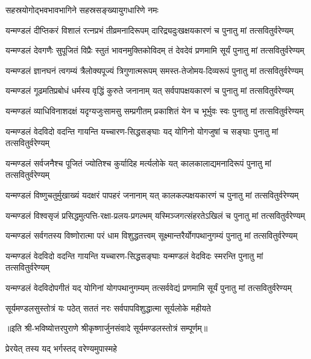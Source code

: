 {सहस्रयोगोद्भवभावभागिने सहस्रसङ्ख्यायुगधारिणे नमः}

\twolineshloka
{यन्मण्डलं दीप्तिकरं विशालं रत्नप्रभं तीव्रमनादिरूपम्}
{दारिद्र्यदुःखक्षयकारणं च पुनातु मां तत्सवितुर्वरेण्यम्}

\twolineshloka
{यन्मण्डलं देवगणैः सुपूजितं   विप्रैः स्तुतं भावनमुक्तिकोविदम्}
{तं देवदेवं प्रणमामि सूर्यं   पुनातु मां तत्सवितुर्वरेण्यम्}

\twolineshloka
{यन्मण्डलं ज्ञानघनं त्वगम्यं   त्रैलोक्यपूज्यं त्रिगुणात्मरूपम्}
{समस्त-तेजोमय-दिव्यरूपं   पुनातु मां तत्सवितुर्वरेण्यम्}

\twolineshloka
{यन्मण्डलं गूढमतिप्रबोधं   धर्मस्य वृद्धिं कुरुते जनानाम्}
{यत् सर्वपापक्षयकारणं च   पुनातु मां तत्सवितुर्वरेण्यम्}

\twolineshloka
{यन्मण्डलं व्याधिविनाशदक्षं   यदृग्यजुःसामसु सम्प्रगीतम्}
{प्रकाशितं येन च भूर्भुवः स्वः   पुनातु मां तत्सवितुर्वरेण्यम्}

\twolineshloka
{यन्मण्डलं वेदविदो वदन्ति   गायन्ति यच्चारण-सिद्धसङ्घाः}
{यद् योगिनो योगजुषां च सङ्घाः   पुनातु मां तत्सवितुर्वरेण्यम्}

\twolineshloka
{यन्मण्डलं सर्वजनैश्च पूजितं   ज्योतिश्च कुर्यादिह मर्त्यलोके}
{यत् कालकालाद्यमनादिरूपं   पुनातु मां तत्सवितुर्वरेण्यम्}

\twolineshloka
{यन्मण्डलं विष्णुचतुर्मुखाख्यं यदक्षरं पापहरं जनानाम्}
{यत् कालकल्पक्षयकारणं च   पुनातु मां तत्सवितुर्वरेण्यम्}

\twolineshloka
{यन्मण्डलं विश्वसृजं प्रसिद्धमुत्पत्ति-रक्षा-प्रलय-प्रगल्भम्}
{यस्मिञ्जगत्संहरतेऽखिलं च   पुनातु मां तत्सवितुर्वरेण्यम्}

\twolineshloka
{यन्मण्डलं सर्वगतस्य विष्णोरात्मा   परं धाम विशुद्धतत्त्वम्}
{सूक्ष्मान्तरैर्योगपथानुगम्यं   पुनातु मां तत्सवितुर्वरेण्यम्}

\twolineshloka
{यन्मण्डलं वेदविदो वदन्ति   गायन्ति यच्चारण-सिद्धसङ्घाः}
{यन्मण्डलं वेदविदः स्मरन्ति   पुनातु मां तत्सवितुर्वरेण्यम्}

\twolineshloka
{यन्मण्डलं वेदविदोपगीतं   यद् योगिनां योगपथानुगम्यम्}
{तत्सर्ववेद्यं  प्रणमामि सूर्यं   पुनातु मां तत्सवितुर्वरेण्यम्}

\twolineshloka
{सूर्यमण्डलसुस्तोत्रं यः पठेत् सततं नरः}
{सर्वपापविशुद्धात्मा  सूर्यलोके महीयते}

॥इति श्री-भविष्योत्तरपुराणे श्रीकृष्णार्जुनसंवादे सूर्यमण्डलस्तोत्रं सम्पूर्णम्॥

\closesub

{प्रेरयेत् तस्य यद् भर्गस्तद् वरेण्यमुपास्महे}
